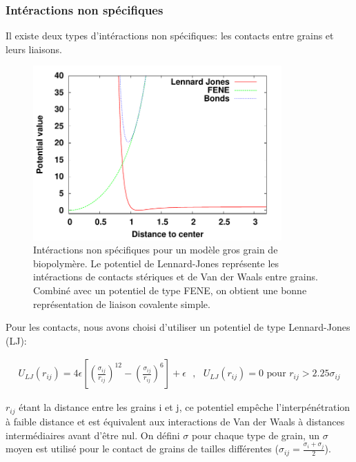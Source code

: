 \documentclass[a4paper,11pt]{article}
\begin{document}
\subsubsection*{Intéractions non spécifiques}

Il existe deux types d'intéractions non spécifiques: les contacts entre grains et leurs liaisons. 

\begin{figure}[H]
\begin{center}
\includegraphics[width=0.85\textwidth]{nonspec.pdf}

\caption{Intéractions non spécifiques pour un modèle gros grain de biopolymère. Le potentiel de Lennard-Jones représente les intéractions de contacts stériques et de Van der Waals entre grains. Combiné avec un potentiel de type FENE, on obtient une bonne représentation de liaison covalente simple.}
\label{nonspecificinterac}
\end{center}
\end{figure}


Pour les contacts, nous avons choisi d'utiliser un potentiel de type Lennard-Jones (LJ):

\begin{eqnarray}
U_{LJ}(r_{ij})= 4\epsilon \left[\left(\frac{\sigma_{ij}}{r_{ij}}\right)^{12}-\left(\frac{\sigma_{ij}}{r_{ij}}\right)^{6}\right] + \epsilon \text{ }, \text{ } U_{LJ}(r_{ij})=0 \text{ pour }  r_{ij}> 2.25 \sigma_{ij}
\end{eqnarray}

$r_{ij}$ étant la distance entre les grains i et j, ce potentiel empêche l'interpénétration à faible distance et est équivalent aux interactions de Van der Waals à distances intermédiaires avant d'être nul. On défini $\sigma$ pour chaque type de grain, un $\sigma$ moyen est utilisé pour le contact de grains de tailles différentes ($\sigma_{ij}=\frac{\sigma_i+\sigma_j}{2}$).
\end{document}
